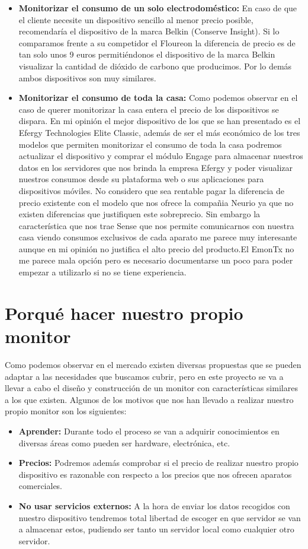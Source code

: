 \begin{itemize}
	\item\textbf{Monitorizar el consumo de un solo electrodoméstico: } En caso de que el cliente necesite un dispositivo sencillo al menor precio posible, recomendaría el dispositivo de la marca Belkin  (Conserve Insight). Si lo comparamos frente a su competidor el Floureon la diferencia de precio es de tan solo unos 9 euros permitiéndonos el dispositivo de la marca Belkin visualizar la cantidad de dióxido de carbono que producimos. Por lo demás ambos dispositivos son muy similares.
	\item\textbf{Monitorizar el consumo de toda la casa: } Como podemos observar en el caso de querer monitorizar la casa entera el precio de los dispositivos se dispara. En mi opinión el mejor dispositivo de los que se han presentado es el Efergy Technologies Elite Classic, además de ser el más económico de los tres modelos que permiten monitorizar el consumo de toda la casa podremos actualizar el dispositivo y comprar el módulo Engage para almacenar nuestros datos en los servidores que nos brinda la empresa Efergy y poder visualizar nuestros consumos desde su plataforma web o sus aplicaciones para dispositivos móviles. No considero que sea rentable pagar la diferencia de precio existente con el modelo que nos ofrece la compañia Neurio ya que no existen diferencias que justifiquen este sobreprecio. Sin embargo la característica que nos trae Sense que nos permite comunicarnos con nuestra casa viendo consumos exclusivos de cada aparato me parece muy interesante aunque en mi opinión no justifica el alto precio del producto.El EmonTx no me parece mala opción pero es necesario documentarse un poco para poder empezar a utilizarlo si no se tiene experiencia.
	
\end{itemize}

\section{Porqué hacer nuestro propio monitor}

Como podemos observar en el mercado existen diversas propuestas que se pueden adaptar a las necesidades que buscamos cubrir, pero en este proyecto se va a llevar a cabo el diseño y construcción de un monitor con características similares a los que existen. Algunos de los motivos que nos han llevado a realizar nuestro propio monitor son los siguientes:

\begin{itemize}
	\item\textbf{Aprender: } Durante todo el proceso se van a adquirir conocimientos en diversas áreas como pueden ser hardware, electrónica, etc.
	\item\textbf{Precios: } Podremos además comprobar si el precio de realizar nuestro propio dispositivo es razonable con respecto a los precios que nos ofrecen aparatos comerciales.
	\item\textbf{No usar servicios externos: } A la hora de enviar los datos recogidos con nuestro dispositivo tendremos total libertad de escoger en que servidor se van a almacenar estos, pudiendo ser tanto un servidor local como cualquier otro servidor.
\end{itemize}
